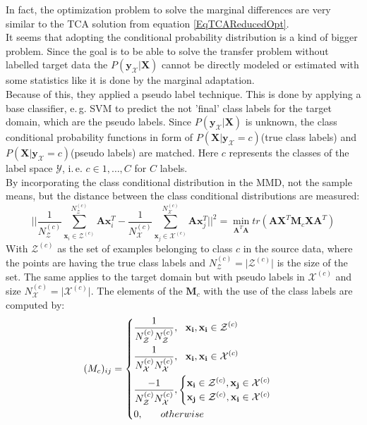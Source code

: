 In fact, the optimization problem to solve the marginal differences are very similar to the \acs{TCA} solution from equation \eqref{EqTCAReducedOpt}.\cite{Pan.2011}\\
It seems that adopting the conditional probability distribution is a kind of bigger problem.
Since the goal is to be able to solve the transfer problem without labelled target data the $P(\mathbf{y}_\mathcal{X}\vert \mathbf{X})$ cannot be directly modeled or estimated with some statistics like it is done by the marginal adaptation.\cite{Long.}\\
Because of this, they applied a pseudo label technique.
This is done by applying a base classifier, e.\,g. \acs{SVM} to predict the not 'final' class labels for the target domain, which are the pseudo labels.
Since $P(\mathbf{y}_\mathcal{X}\vert \mathbf{X})$ is unknown, the class conditional probability functions in form of $P(\mathbf{X}\vert \mathbf{y}_\mathcal{X}=c)$(true class labels) and $P(\mathbf{X}\vert \mathbf{y}_\mathcal{X}=c)$(pseudo labels) are matched.
Here $c$ represents the classes of the label space $\mathcal{Y}$, i.\,e. $c\in{1,\dots,C}$ for $C$ labels.\cite{Long.}\\
By incorporating the class conditional distribution in the \acl{MMD}, not the sample means, but the distance between the class conditional distributions are measured:\cite{Long.}
\begin{equation}\label{EqJDAConditionalOpt}
\bigg|\bigg| \frac{1}{N_\mathcal{Z}^{(c)}} \sum_{\mathbf{x}_i \in \mathcal{Z}^{(c)}}^{N_\mathcal{Z}^{(c)}}\mathbf{A}\mathbf{x}_i^T- \frac{1}{N_\mathcal{X}^{(c)}} \sum_{\mathbf{x}_j \in \mathcal{X}^{(c)}}^{N_\mathcal{X}^{(c)}}\mathbf{A}\mathbf{x}_j^T \bigg|\bigg|^2 = \min_{\mathbf{A}^T\mathbf{A}} tr(\mathbf{A}\mathbf{X}^T\mathbf{M}_c\mathbf{X}\mathbf{A}^T)
\end{equation}
With  $\mathcal{Z}^{(c)}$ as the set of examples belonging to class $c$ in the source data, where the points are having the true class labels and $N_\mathcal{Z}^{(c)} = \vert\mathcal{Z}^{(c)}\vert$ is the size of the set.
The same applies to the target domain but with pseudo labels in $\mathcal{X}^{(c)}$ and size $N_\mathcal{X}^{(c)} = \vert\mathcal{X}^{(c)}\vert$.
The elements of the $\mathbf{M}_c$ with the use of the class labels are computed by: \cite{Long.}
\begin{equation}\label{EqJDAMMDPseudoMatrix}
(M_c)_{ij}= \begin{dcases}
\frac{1}{N_\mathcal{Z}^{(c)} N_\mathcal{Z}^{(c)} },\>\>\> \mathbf{x_i},\mathbf{x_i} \in \mathcal{Z}^{(c)} \\
\frac{1}{N_\mathcal{X}^{(c)}  N_\mathcal{X}^{(c)}  },\>\>\> \mathbf{x_i},\mathbf{x_i} \in \mathcal{X}^{(c)} \\
\frac{-1}{N_\mathcal{Z} ^{(c)} N_\mathcal{X} ^{(c)} }, \begin{cases}
\mathbf{x_i} \in \mathcal{Z}^{(c)}, \mathbf{x_j} \in \mathcal{X}^{(c)}\\
\mathbf{x_j} \in \mathcal{Z}^{(c)}, \mathbf{x_i} \in \mathcal{X}^{(c)}\\
\end{cases}\\
0,\>\>\>\>\>\>\>\> otherwise
\end{dcases}
\end{equation}

